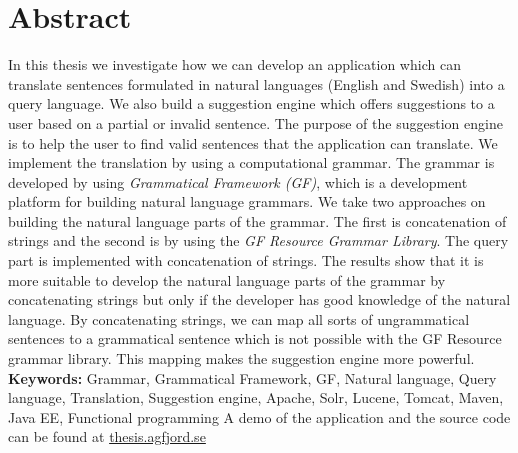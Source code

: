 \begingroup
\let\clearpage\relax
\let\cleardoublepage\relax
\let\cleardoublepage\relax
\chapter*{Abstract}
In this thesis we investigate how we can develop an application which can translate sentences formulated in natural languages (English and Swedish) into a query language. We also build a suggestion engine which offers suggestions to a user based on a partial or invalid sentence. The purpose of the suggestion engine is to help the user to find valid sentences that the application can translate.
\newline
\newline
We implement the translation by using a computational grammar. The grammar is developed by using \emph{Grammatical Framework (GF)}, which is a development platform for building natural language grammars. We take two approaches on building the natural language parts of the grammar. The first is concatenation of strings and the second is by using the \emph{GF Resource Grammar Library}. The query part is implemented with concatenation of strings.
\newline
\newline
The results show that it is more suitable to develop the natural language parts of the grammar by concatenating strings but only if the developer has good knowledge of the natural language. By concatenating strings, we can map all sorts of ungrammatical sentences to a grammatical sentence which is not possible with the GF Resource grammar library. This mapping makes the suggestion engine more powerful.
\newline
\newline
\textbf{Keywords:} Grammar, Grammatical Framework, GF, Natural language, Query language, Translation, Suggestion engine, Apache, Solr, Lucene, Tomcat, Maven, Java EE, Functional programming
\newline
\newline
A demo of the application and the source code can be found at \href{http://thesis.agfjord.se/}{thesis.agfjord.se}

\endgroup			

\vfill